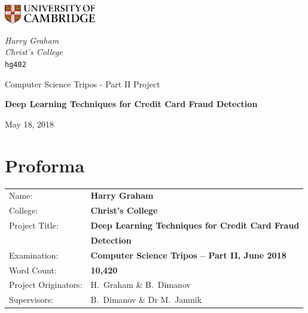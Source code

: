 \documentclass[12pt,a4paper,twoside]{report}
\begin{document}
\begin{titlepage}
	\noindent
	\begin{minipage}[t][][t]{0.5\textwidth}
		\includegraphics[width=40mm]{CamLogo.jpg}
	\end{minipage}
	\begin{minipage}{0.5\textwidth}
	\begin{flushright}
		\large
		\textit{Harry Graham}
		\\
		\textit{Christ's College}
		\\
		\texttt{hg402}
	\end{flushright}
	\end{minipage}
	
	\begin{center}
	\vspace{6cm}
	{\sc\large Computer Science Tripos - Part II Project\par}
	\vspace{0.5cm}
	{\huge\bf Deep Learning Techniques for Credit Card Fraud Detection\par}
	\vspace{0.5cm}
	{\large May 18, 2018 \par}
	\end{center}

\end{titlepage}

\pagestyle{plain}

\section*{\huge Proforma}
\vspace{0.5cm}
{\large
\begin{tabular}{ll}
Name:               & \bf Harry Graham \\
College:            & \bf Christ's College \\
Project Title:      & \bf Deep Learning Techniques for Credit Card Fraud \\
			 & \bf Detection \\
Examination:        & \bf Computer Science Tripos -- Part II, June 2018 \\
Word Count:         &  \bf 10,420 \\
Project Originators: & H.~Graham \& B.~Dimanov \\
Supervisors:         & B.~Dimanov \& Dr M.~Jamnik
\end{tabular}
}
\end{document}
